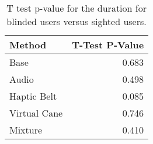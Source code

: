 
\begin{table}[!htb]
\centering
\caption{T test p-value for the duration for blinded users versus sighted users.}
\label{tab:ttest_duration}
\begin{tabular}{lr}
\toprule
      Method &  T-Test P-Value \\
\midrule
        Base &           0.683 \\
       Audio &           0.498 \\
 Haptic Belt &           0.085 \\
Virtual Cane &           0.746 \\
     Mixture &           0.410 \\
\bottomrule
\end{tabular}
\end{table}

